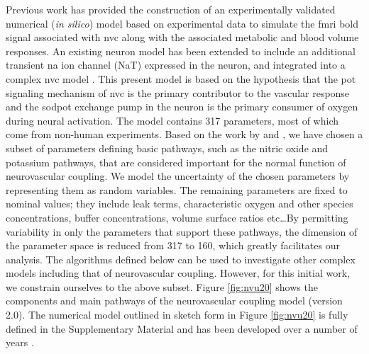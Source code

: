 \documentclass[smallextended]{svjour3}
\numberwithin{equation}{section}
\begin{document}
Previous work \cite{Mathias2018} has provided  the construction of an experimentally validated numerical (\textit{in silico}) model based on experimental data to simulate the \gls{fmri} \gls{bold} signal associated with \gls{nvc} along with the associated metabolic and blood volume responses. An existing neuron model \citep{Mathias2017, Mathias2017a} has been extended to include an additional transient \gls{na} ion channel (NaT) expressed in the neuron, and integrated into a complex \gls{nvc} model \citep{Dormanns2015, Dormanns2016b, Kenny2017a}. This present model is based on the hypothesis that the \gls{pot} signaling mechanism of \gls{nvc} is the primary contributor to the vascular response and the \gls{sodpot} exchange pump in the neuron is the primary consumer of oxygen during neural activation. The model contains 317 parameters, most of which come from non-human experiments. Based on the work by \cite{Dormanns2016b} and \cite{Kenny2018}, we have chosen a subset of parameters defining basic pathways, such as  the nitric oxide and potassium pathways,   that are considered important for the normal function of neurovascular coupling.  We model the uncertainty of the chosen parameters  by representing them as random variables. The remaining  parameters are fixed to nominal values; they include leak terms, characteristic oxygen and other species concentrations, buffer concentrations, volume surface ratios etc\dots By permitting variability in only the parameters that support these pathways, the dimension of the parameter space is reduced from 317 to 160, which greatly facilitates our analysis. The algorithms defined below can be used to investigate other complex models including that of neurovascular coupling. However, for this initial work, we constrain ourselves to the above subset. 
Figure \ref{fig:nvu20} shows the components and main pathways of the neurovascular coupling model (version 2.0). The numerical model outlined in sketch form in Figure \ref{fig:nvu20} is fully defined in the Supplementary Material  and has been developed over a number of years \cite{Farr2011,Dormanns2015,Dormanns2016b}. 
\end{document}
